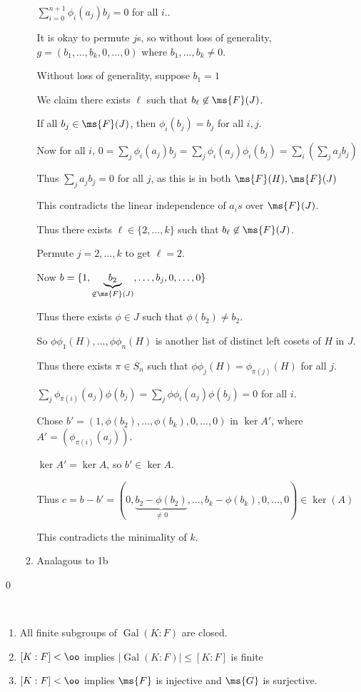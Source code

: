 \documentclass[x11names,reqno,14pt]{extarticle}
\DeclareMathOperator{\Gal}{Gal}
\begin{document}
\begin{enumerate}
\begin{enumerate}[label=(\alph*)]
$\sum_{i=0}^{n + 1}\phi_i(a_j)b_j = 0$ for all $i$.. 

It is okay to permute $j$s, so without loss of generality, $g = (b_1, \dots, b_k, 0, \dots, 0)$ where $b_1, \dots, b_k \neq 0$. 

Without loss of generality, suppose $b_1 = 1$

We claim there exists $\ell$ such that $b_\ell \not\in \ms{F}(J)$.

If all $b_j \in \ms{F}(J)$, then $\phi_i(b_j) = b_j$ for all $i, j$. 

Now for all $i$, $0 = \sum_j\phi_i(a_j)b_j = \sum_j\phi_i(a_j)\phi_i(b_j) = \sum_i(\sum_j a_jb_j)$ 

Thus $\sum_ja_jb_j = 0$ for all $j$, as this is in both $\ms{F}(H),\ms{F}(J)$

This contradicts the linear independence of $a_is$ over $\ms{F}(J)$. 

Thus there exists $\ell\in\{2,\dots, k\}$ such that $b_\ell \not\in\ms{F}(J)$.

Permute $j = 2, \dots, k$ to get $\ell = 2$. 

Now $b = \{1, \underbrace{b_2}_{\not\in\ms{F}(J)}, \dots, b_j, 0, \dots, 0\}$

Thus there exists $\phi \in J$ such that $\phi(b_2) \neq b_2$. 

So $\phi\phi_1(H), \dots, \phi\phi_n(H)$ is another list of distinct left cosets of $H$ in $J$.

Thus there exists $\pi \in S_n$ such that $\phi\phi_j(H) = \phi_{\pi(j)}(H)$ for all $j$. 

$\sum_j\phi_{\pi(i)}(a_j)\phi(b_j) = \sum_j\phi\phi_i(a_j)\phi(b_j) = 0$ for all $i$. 

Chose $b' = (1, \phi(b_2),\dots,\phi(b_k), 0,\dots,0)$ in $\ker A'$, where $A' = (\phi_{\pi(i)}(a_j))$. 

$\ker A' = \ker A$, so $b' \in \ker A$. 

Thus $c = b - b' = (0, \underbrace{b_2 - \phi(b_2)}_{\neq0}, \dots, b_k - \phi(b_k), 0, \dots, 0) \in \ker (A)$

This contradicts the minimality of $k$.

\item Analagous to 1b

\end{enumerate}


\end{enumerate}

\qed

\cor\,
\begin{enumerate}[label=(\alph*)]

\item All finite subgroups of $\Gal(K:F)$ are closed. 

\item $[K:F] <\oo$ implies $|\Gal(K:F)| \leq [K:F]$ is finite

\item $[K:F]<\oo$ implies $\ms{F}$ is injective and $\ms{G}$ is surjective.

\end{enumerate}
\end{document}
